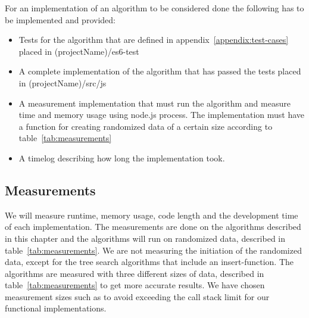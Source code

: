 \documentclass {article}
\begin{document}
For an implementation of an algorithm to be considered done the following has to be implemented and provided:
\begin{itemize}
\item Tests for the algorithm that are defined in appendix~\ref{appendix:test-cases} placed in (projectName)/es6-test
\item A complete implementation of the algorithm that has passed the tests placed in (projectName)/src/js
\item A measurement implementation that must run the algorithm and measure time and memory usage using node.js process. The implementation must have a function for creating randomized data of a certain size according to table~\ref{tab:measurements} 
\item A timelog describing how long the implementation took. 
\end{itemize}
\subsection{Measurements}
We will measure runtime, memory usage, code length and the development time of each implementation. The measurements are done on the algorithms described in this chapter and the algorithms will run on randomized data, described in table~\ref{tab:measurements}. We are not measuring the initiation of the randomized data, except for the tree search algorithms that include an insert-function. The algorithms are measured with three different sizes of data, described in table~\ref{tab:measurements} to get more accurate results. We have chosen measurement sizes such as to avoid exceeding the call stack limit for our functional implementations.
\end{document}
